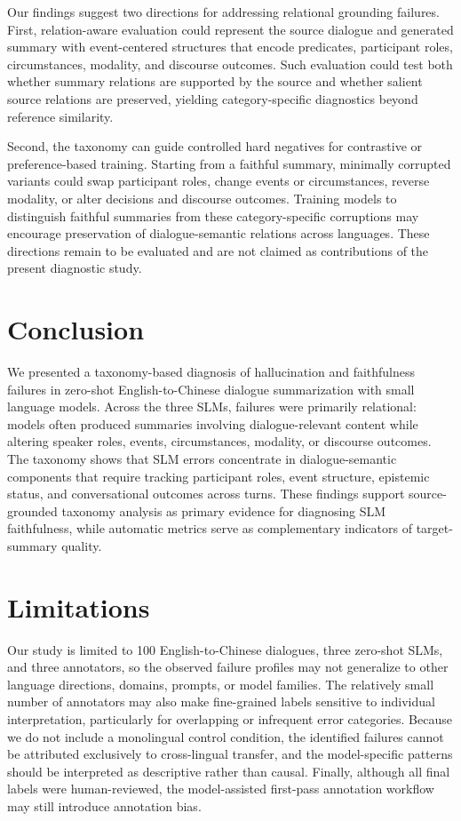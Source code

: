 \documentclass[11pt]{article}
\begin{document}
Our findings suggest two directions for addressing relational grounding failures. First, relation-aware evaluation could represent the source dialogue and generated summary with event-centered structures that encode predicates, participant roles, circumstances, modality, and discourse outcomes. Such evaluation could test both whether summary relations are supported by the source and whether salient source relations are preserved, yielding category-specific diagnostics beyond reference similarity.

Second, the taxonomy can guide controlled hard negatives for contrastive or preference-based training. Starting from a faithful summary, minimally corrupted variants could swap participant roles, change events or circumstances, reverse modality, or alter decisions and discourse outcomes. Training models to distinguish faithful summaries from these category-specific corruptions may encourage preservation of dialogue-semantic relations across languages. These directions remain to be evaluated and are not claimed as contributions of the present diagnostic study.


\section{Conclusion}

We presented a taxonomy-based diagnosis of hallucination and faithfulness failures in zero-shot English-to-Chinese dialogue summarization with small language models. Across the three SLMs, failures were primarily relational: models often produced summaries involving dialogue-relevant content while altering speaker roles, events, circumstances, modality, or discourse outcomes. The taxonomy shows that SLM errors concentrate in dialogue-semantic components that require tracking participant roles, event structure, epistemic status, and conversational outcomes across turns. These findings support source-grounded taxonomy analysis as primary evidence for diagnosing SLM faithfulness, while automatic metrics serve as complementary indicators of target-summary quality.



\section{Limitations}

Our study is limited to 100 English-to-Chinese dialogues, three zero-shot SLMs, and three annotators, so the observed failure profiles may not generalize to other language directions, domains, prompts, or model families. The relatively small number of annotators may also make fine-grained labels sensitive to individual interpretation, particularly for overlapping or infrequent error categories. Because we do not include a monolingual control condition, the identified failures cannot be attributed exclusively to cross-lingual transfer, and the model-specific patterns should be interpreted as descriptive rather than causal. Finally, although all final labels were human-reviewed, the model-assisted first-pass annotation workflow may still introduce annotation bias.
\end{document}
